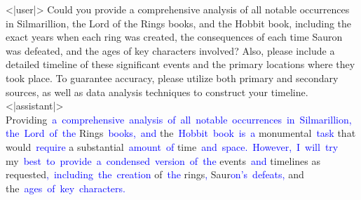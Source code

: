 \documentclass{article}
\begin{document}
\begin{tcolorbox}[colframe=black,colback=white]
<|user|>
Could you provide a comprehensive analysis of all notable occurrences in Silmarillion, the Lord of the Rings books, and the Hobbit book, including the exact years when each ring was created, the consequences of each time Sauron was defeated, and the ages of key characters involved? Also, please include a detailed timeline of these significant events and the primary locations where they took place. To guarantee accuracy, please utilize both primary and secondary sources, as well as data analysis techniques to construct your timeline.
<|assistant|>
Providing\textcolor{blue}{~a}\textcolor{blue}{~comprehensive}\textcolor{blue}{~analysis}\textcolor{blue}{~of}\textcolor{blue}{~all}\textcolor{blue}{~notable}\textcolor{blue}{~occurrences}\textcolor{blue}{~in}\textcolor{blue}{~Sil}\textcolor{blue}{mar}\textcolor{blue}{illion}\textcolor{blue}{,}\textcolor{blue}{~the}\textcolor{blue}{~Lord}\textcolor{blue}{~of}\textcolor{blue}{~the} Rings\textcolor{blue}{~books}\textcolor{blue}{,}\textcolor{blue}{~and} the\textcolor{blue}{~Hob}\textcolor{blue}{bit}\textcolor{blue}{~book}\textcolor{blue}{~is}\textcolor{blue}{~a} monumental\textcolor{blue}{~task} that would\textcolor{blue}{~require} a substantial\textcolor{blue}{~amount}\textcolor{blue}{~of} time\textcolor{blue}{~and}\textcolor{blue}{~space}\textcolor{blue}{.}\textcolor{blue}{~However}\textcolor{blue}{,}\textcolor{blue}{~I}\textcolor{blue}{~will}\textcolor{blue}{~try} my\textcolor{blue}{~best}\textcolor{blue}{~to}\textcolor{blue}{~provide}\textcolor{blue}{~a}\textcolor{blue}{~condensed}\textcolor{blue}{~version}\textcolor{blue}{~of}\textcolor{blue}{~the} events\textcolor{blue}{~and} timelines as requested\textcolor{blue}{,}\textcolor{blue}{~including}\textcolor{blue}{~the}\textcolor{blue}{~creation} of\textcolor{blue}{~the} rings\textcolor{blue}{,} Saur\textcolor{blue}{on}\textcolor{blue}{'s}\textcolor{blue}{~defeats}\textcolor{blue}{,} and the\textcolor{blue}{~ages}\textcolor{blue}{~of}\textcolor{blue}{~key}\textcolor{blue}{~characters}\textcolor{blue}{.}\textcolor{blue}{~

}
\end{tcolorbox}
\end{document}
